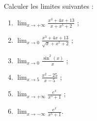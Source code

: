 \begin{exercice}\label{exoExamen-0002}

  Calculer les limites suivantes :
  \begin{enumerate}
  \item $\displaystyle \lim_{x\to +\infty}\frac{x^3+4x+13}{x+x^5+2}$ ;
  \item $\displaystyle \lim_{x\to 0}\frac{x^3+4x+13}{\sqrt{x}+x^5+2}$ ;
  \item $\displaystyle \lim_{x\to 0}\frac{\sin^2(x)}{x}$ ;
  \item $\displaystyle \lim_{x\to 5}\frac{x^2-25}{x-5}$ ;
  \item $\displaystyle \lim_{x\to +\infty}\frac{e^x}{x^5+1}$ ;
  \item $\displaystyle \lim_{x\to -\infty}\frac{e^x}{x^5+1}$.
  \end{enumerate}
\end{exercice}
